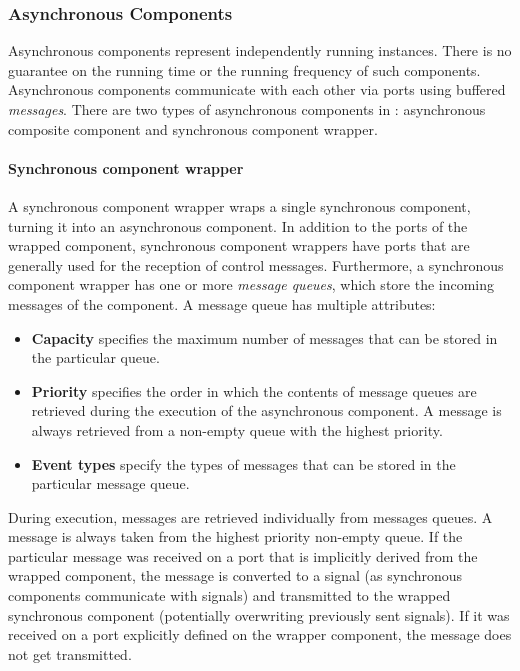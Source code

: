 \subsubsection{Asynchronous Components}
Asynchronous components represent independently running instances. There is no guarantee on the running time or the running frequency of such components. Asynchronous components communicate with each other via ports using buffered \emph{messages}. There are two types of asynchronous components in \gamma: asynchronous composite component and synchronous component wrapper.
\paragraph{Synchronous component wrapper} A synchronous component wrapper wraps a single synchronous component, turning it into an asynchronous component. In addition to the ports of the wrapped component, synchronous component wrappers have ports that are generally used for the reception of control messages. Furthermore, a synchronous component wrapper has one or more
\emph{message queues}, which store the incoming messages of the component. A message queue has multiple attributes:
\begin{itemize}
	\item \textbf{Capacity} specifies the maximum number of messages that can be stored in the particular
	queue.
	\item \textbf{Priority} specifies the order in which the contents of message queues are retrieved during
	the execution of the asynchronous component. A message is always retrieved from a
	non-empty queue with the highest priority.
	\item \textbf{Event types} specify the types of messages that can be stored in the particular message queue.
\end{itemize}

During execution, messages are retrieved individually from messages queues. A message
is always taken from the highest priority non-empty queue. If the particular message was
received on a port that is implicitly derived from the wrapped component, the message is
converted to a signal (as synchronous components communicate with signals) and transmitted
to the wrapped synchronous component (potentially overwriting previously sent signals). If
it was received on a port explicitly defined on the wrapper component, the message does not
get transmitted.

